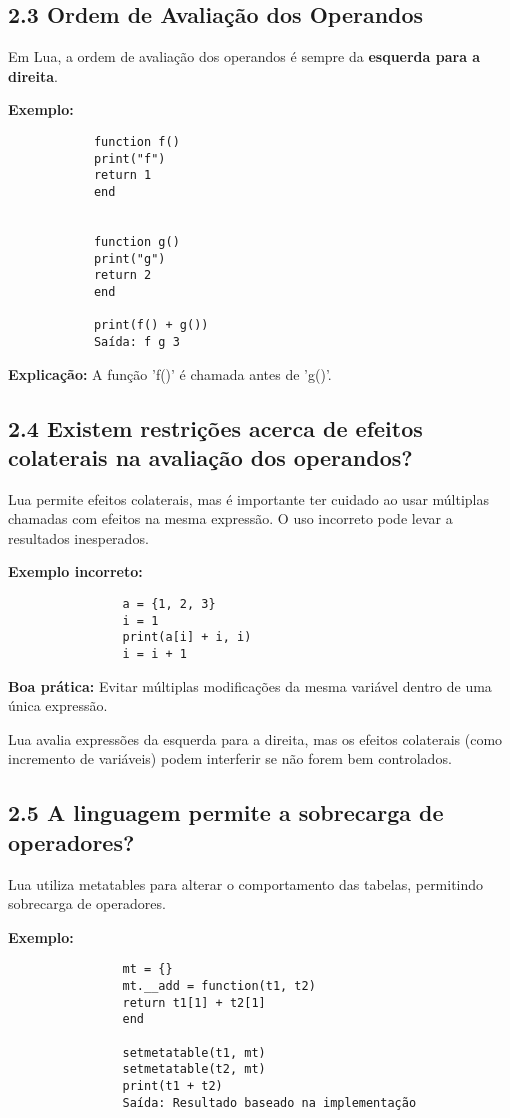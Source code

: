 \documentclass[12pt,a4paper]{article}
\begin{document}
		\subsection*{2.3 Ordem de Avaliação dos Operandos}
		
		Em Lua, a ordem de avaliação dos operandos é sempre da \textbf{esquerda para a direita}.
		
		\textbf{Exemplo:}
		\begin{verbatim}
			function f() 
			print("f")
			return 1
			end
			
			
			function g()
			print("g")
			return 2
			end
			
			print(f() + g()) 
			Saída: f g 3
		\end{verbatim}
		
		\textbf{Explicação:} A função 'f()' é chamada antes de 'g()'.
		
			\subsection*{2.4 Existem restrições acerca de efeitos colaterais na avaliação dos operandos?}
			Lua permite efeitos colaterais, mas é importante ter cuidado ao usar múltiplas chamadas com efeitos na mesma expressão. O uso incorreto pode levar a resultados inesperados.
			
			\textbf{Exemplo incorreto:}
			\begin{verbatim}
				a = {1, 2, 3}
				i = 1
				print(a[i] + i, i)
				i = i + 1
			\end{verbatim}
			
			\textbf{Boa prática:} Evitar múltiplas modificações da mesma variável dentro de uma única expressão.
			
			Lua avalia expressões da esquerda para a direita, mas os efeitos colaterais (como incremento de variáveis) podem interferir se não forem bem controlados.
			
				
				\subsection*{2.5 A linguagem permite a sobrecarga de operadores?}
				
				
				Lua utiliza metatables para alterar o comportamento das tabelas, permitindo sobrecarga de operadores. \cite{codeporting}
				
				\textbf{Exemplo:}
				\begin{verbatim}
				mt = {}
				mt.__add = function(t1, t2)
				return t1[1] + t2[1]
				end
				
				setmetatable(t1, mt)
				setmetatable(t2, mt)
				print(t1 + t2)  
				Saída: Resultado baseado na implementação
			\end{verbatim}
			\newpage
			
\end{document}

